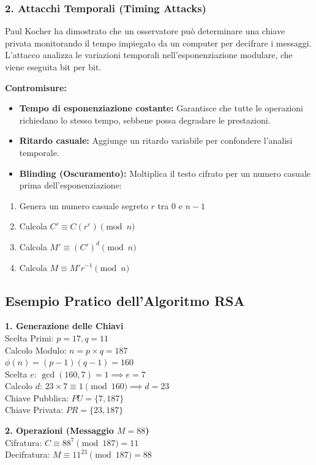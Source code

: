 \documentclass{article}
\begin{document}
\subsubsection*{2. Attacchi Temporali (Timing Attacks)}

Paul Kocher ha dimostrato che un osservatore può determinare una chiave privata monitorando il tempo impiegato da un computer per decifrare i messaggi. L'attacco analizza le variazioni temporali nell'esponenziazione modulare, che viene eseguita bit per bit.

\textbf{Contromisure:}
\begin{itemize}
    \item \textbf{Tempo di esponenziazione costante:} Garantisce che tutte le operazioni richiedano lo stesso tempo, sebbene possa degradare le prestazioni.
    \item \textbf{Ritardo casuale:} Aggiunge un ritardo variabile per confondere l'analisi temporale.
    \item \textbf{Blinding (Oscuramento):} Moltiplica il testo cifrato per un numero casuale prima dell'esponenziazione:
\end{itemize}

\begin{enumerate}
    \item Genera un numero casuale segreto $r$ tra $0$ e $n - 1$
    \item Calcola $C' \equiv C(r^e) \pmod n$
    \item Calcola $M' \equiv (C')^d \pmod n$
    \item Calcola $M \equiv M'r^{-1} \pmod n$
\end{enumerate}

\vspace{0.8cm}

\subsection*{Esempio Pratico dell'Algoritmo RSA}

\begin{center}
\textbf{1. Generazione delle Chiavi} \\
\vspace{0.2cm}
Scelta Primi: $p = 17, q = 11$ \\
Calcolo Modulo: $n = p \times q = 187$ \\
$\phi(n) = (p - 1)(q - 1) = 160$ \\
Scelta $e$: $\gcd(160, 7) = 1 \implies e = 7$ \\
Calcolo $d$: $23 \times 7 \equiv 1 \pmod{160} \implies d = 23$ \\
Chiave Pubblica: $PU = \{7, 187\}$ \\
Chiave Privata: $PR = \{23, 187\}$ \\

\vspace{0.5cm}

\textbf{2. Operazioni (Messaggio $M = 88$)} \\
\vspace{0.2cm}
Cifratura: $C \equiv 88^7 \pmod{187} = 11$ \\
Decifratura: $M \equiv 11^{23} \pmod{187} = 88$
\end{center}
\end{document}
